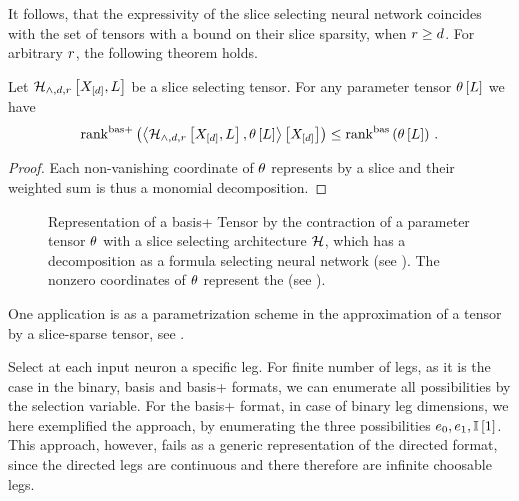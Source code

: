 It follows, that the expressivity of the slice selecting neural network coincides with the set of tensors with a bound on their slice sparsity, when $r\geq d$.
For arbitrary $r$, the following theorem holds.

\begin{theorem}
	Let $\mathcal{H}_{\land,d,r}\left[X_{[d]},L\right]$ be a slice selecting tensor.
	For any parameter tensor $\theta\left[L\right]$ we have
		\[ \mathrm{rank}^{\mathrm{bas+}}\left(\left\langle \mathcal{H}_{\land,d,r}\left[X_{[d]},L\right],\theta\left[L\right]\right\rangle \left[ X_{[d]} \right]\right) \leq \mathrm{rank}^{\mathrm{bas}}\left(\theta\left[L\right]\right) \, . \]
\end{theorem}
\begin{proof}
	Each non-vanishing coordinate of $\theta$ represents by  a slice and their weighted sum is thus a monomial decomposition.
\end{proof}


\begin{figure}[h]
	\begin{center}
		
	\end{center}
	\caption{Representation of a basis+ Tensor by the contraction of a parameter tensor $\theta$ with a slice selecting architecture $\mathcal{H}$, which has a decomposition as a formula selecting neural network (see ).
	The nonzero coordinates of $\theta$ represent the (see ).}
\end{figure}\label{fig:sliceSelectingNN}



One application is as a parametrization scheme in the approximation of a tensor by a slice-sparse tensor, see .



\begin{remark}
	Select at each input neuron a specific leg.
	For finite number of legs, as it is the case in the binary, basis and basis+ formats, we can enumerate all possibilities by the selection variable.
	For the basis+ format, in case of binary leg dimensions, we here exemplified the approach, by enumerating the three possibilities $e_{0},e_{1},\mathbb{I}\left[1\right]$.
	This approach, however, fails as a generic representation of the directed format, since the directed legs are continuous and there therefore are infinite choosable legs.
\end{remark}





